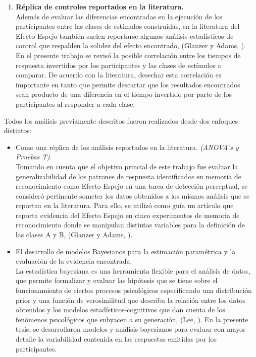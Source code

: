 \begin{enumerate}
\pagebreak
\item \textbf{Réplica de controles reportados en la literatura.}\\

Además de evaluar las diferencias encontradas en la ejecución de los participantes entre las clases de estímulos construidas, en la literatura del Efecto Espejo también suelen reportarse algunos análisis estadísticos de control que respalden la solidez del efecto encontrado, (Glanzer y Adams, \citeyear{Glanzer1990}). En el presente trabajo se revisó la posible correlación entre los tiempos de respuesta invertidos por los participantes y las clases de estímulos a comparar. De acuerdo con la literatura, desechar esta correlación es importante en tanto que permite descartar que los resultados encontrados sean producto de una diferencia en el tiempo invertido por parte de los participantes al responder a cada clase.\\
\end{enumerate}

Todos los análisis previamente descritos fueron realizados desde dos enfoques distintos:\\

\begin{itemize}
\item Como una réplica de los análisis reportados en la literatura. \textit{(ANOVA's y Pruebas T)}.\\

Tomando en cuenta que el objetivo princial de este trabajo fue evaluar la generalizabilidad de los patrones de respuesta identificados en memoria de reconocimiento como Efecto Espejo en una tarea de detección perceptual, se consideró pertinente someter los datos obtenidos a los mismos análisis que se reportan en la literatura. Para ello, se utilizó como guía un artículo que reporta evidencia del Efecto Espejo en cinco experimentos de memoria de reconocimiento donde se manipulan distintas variables para la definición de las clases A y B, (Glanzer y Adams, \citeyear{Glanzer1990}).\\

\item El desarrollo de modelos Bayesianos para la estimación paramétrica y la evaluación de la evidencia encontrada.\\

La estadística bayesiana es una herramienta flexible para el análisis de datos, que permite formalizar y evaluar las hipótesis que se tiene sobre el funcionamiento de ciertos procesos psicológicos especificando una distribución prior y una función de verosimilitud que describa la relación entre los datos obtenidos y los modelos estadísticos-cognitivos que dan cuenta de los fenómenos psicológicos que subyacen a su generación, (Lee, \citeyear{Lee2011}). En la presente tesis, se desarrollaron modelos y análisis bayesianos para evaluar con mayor detalle la variabilidad contenida en las respuestas emitidas por los participantes.\\
\end{itemize}










